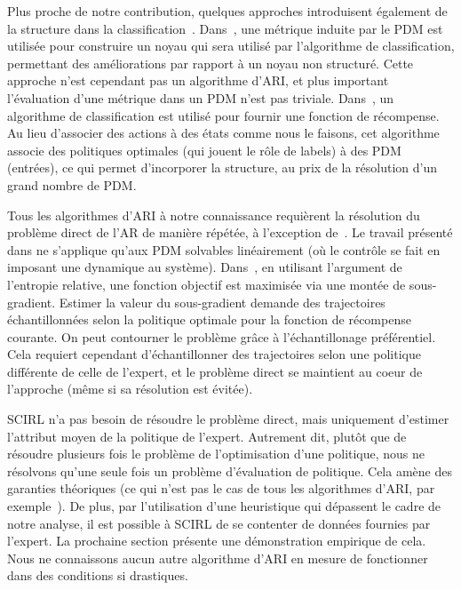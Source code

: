 \documentclass[english,utf8]{./hermes-journal}
\begin{document}
Plus proche de notre contribution, quelques approches introduisent également de la structure dans la classification~\cite{Melo:2010,Ratliff:2006}. Dans~\cite{Melo:2010},
une métrique induite par le PDM est utilisée pour construire un noyau qui sera utilisé par l'algorithme de classification, permettant des améliorations par rapport à un noyau non structuré. Cette approche n'est cependant pas un algorithme d'ARI, et plus important l'évaluation d'une métrique dans un PDM n'est pas triviale. Dans~\cite{Ratliff:2006}, un algorithme de classification est utilisé pour fournir une fonction de récompense. Au lieu d'associer des actions à des états comme nous le faisons, cet algorithme associe des politiques optimales (qui jouent le rôle de labels) à des PDM (entrées), ce qui permet d'incorporer la structure, au prix de la résolution d'un grand nombre de PDM.

Tous les algorithmes d'ARI à notre connaissance requièrent la résolution du problème direct de l'AR de manière répétée, à l'exception de~\cite{Dvij:2010,boularias:2011}.
Le travail présenté dans \cite{Dvij:2010} ne s'applique qu'aux PDM solvables linéairement (où le contrôle se fait en imposant une dynamique au système).
Dans~\cite{boularias:2011}, en utilisant l'argument de l'entropie relative, une fonction objectif est maximisée via une montée de sous-gradient. Estimer la valeur du sous-gradient demande des trajectoires échantillonnées selon la politique optimale pour la fonction de récompense courante. On peut contourner le problème grâce à l'échantillonage préférentiel. Cela requiert cependant d'échantillonner des trajectoires selon une politique différente de celle de l'expert, et le problème direct se maintient au coeur de l'approche (même si sa résolution est évitée).

SCIRL n'a pas besoin de résoudre le problème direct, mais uniquement d'estimer l'attribut moyen de la politique de l'expert. Autrement dit, plutôt que de résoudre plusieurs fois le problème de l'optimisation d'une politique, nous ne résolvons qu'une seule fois un problème d'évaluation de politique. Cela amène des garanties théoriques (ce qui n'est pas le cas de tous les algorithmes d'ARI, par exemple~\cite{boularias:2011}). De plus, par l'utilisation d'une heuristique qui dépassent le cadre de notre analyse, il est possible à SCIRL de se contenter de données fournies par l'expert. La prochaine section présente une démonstration empirique de cela. Nous ne connaissons aucun autre algorithme d'ARI en mesure de fonctionner dans des conditions si drastiques.
\end{document}
